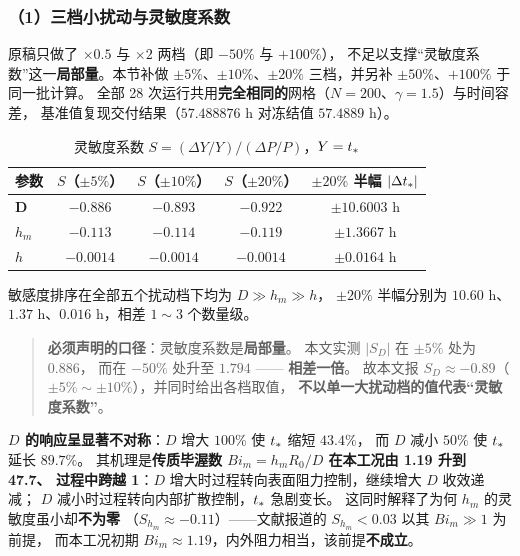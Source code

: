 \subsubsection*{（1）三档小扰动与灵敏度系数}

原稿只做了 $\times0.5$ 与 $\times2$ 两档（即 $-50\%$ 与 $+100\%$），
不足以支撑``灵敏度系数''这一\textbf{局部量}。本节补做
$\pm5\%$、$\pm10\%$、$\pm20\%$ 三档，并另补 $\pm50\%$、$+100\%$ 于同一批计算。
全部 28 次运行共用\textbf{完全相同的}网格（$N=200$、$\gamma=1.5$）与时间容差，
基准值复现交付结果（$57.488876$ h 对冻结值 $57.4889$ h）。

\begin{table}[H]
  \centering
  \caption{灵敏度系数 $S=(\Delta Y/Y)/(\Delta P/P)$，$Y=t_{*}$}
  \label{tab:S}
  \footnotesize
  \begin{tabular}{@{}lcccc@{}}
    \toprule
    参数 & $S$（$\pm5\%$） & $S$（$\pm10\%$） & $S$（$\pm20\%$）
         & $\pm20\%$ 半幅 $\lvert\Delta t_{*}\rvert$ \\
    \midrule
    $\boldsymbol{D}$ & $\mathbf{-0.886}$ & $\mathbf{-0.893}$ & $\mathbf{-0.922}$ & $\pm\mathbf{10.6003}$ h \\
    $h_m$ & $-0.113$ & $-0.114$ & $-0.119$ & $\pm1.3667$ h \\
    $h$ & $-0.0014$ & $-0.0014$ & $-0.0014$ & $\pm0.0164$ h \\
    \bottomrule
  \end{tabular}
\end{table}

敏感度排序在全部五个扰动档下均为 $D\gg h_m\gg h$，
$\pm20\%$ 半幅分别为 $10.60$ h、$1.37$ h、$0.016$ h，相差 $1\sim3$ 个数量级。

\begin{quote}
  \textbf{必须声明的口径}：灵敏度系数是\textbf{局部量}。
  本文实测 $\lvert S_D\rvert$ 在 $\pm5\%$ 处为 $0.886$，
  而在 $-50\%$ 处升至 $\mathbf{1.794}$ —— \textbf{相差一倍}。
  故本文报 $S_D\approx-0.89$（$\pm5\%\sim\pm10\%$），并同时给出各档取值，
  \textbf{不以单一大扰动档的值代表``灵敏度系数''}。
\end{quote}

\textbf{$D$ 的响应呈显著不对称}：$D$ 增大 $100\%$ 使 $t_{*}$ 缩短 $43.4\%$，
而 $D$ 减小 $50\%$ 使 $t_{*}$ 延长 $89.7\%$。
其机理是\textbf{传质毕渥数 $Bi_m=h_mR_0/D$ 在本工况由 1.19 升到 47.7、
过程中跨越 1}：$D$ 增大时过程转向表面阻力控制，继续增大 $D$ 收效递减；
$D$ 减小时过程转向内部扩散控制，$t_{*}$ 急剧变长。
这同时解释了为何 $h_m$ 的灵敏度虽小却\textbf{不为零}
（$S_{h_m}\approx-0.11$）——文献报道的 $S_{h_m}<0.03$ 以其 $Bi_m\gg1$ 为前提，
而本工况初期 $Bi_m\approx1.19$，内外阻力相当，该前提\textbf{不成立}。


